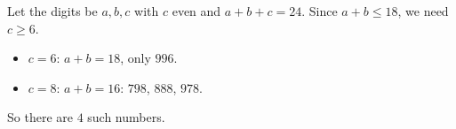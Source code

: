 Let the digits be $a,b,c$ with $c$ even and $a+b+c=24$. Since $a+b\le18$, we need $c\ge6$.
\begin{itemize}
\item $c=6$: $a+b=18$, only $996$.
\item $c=8$: $a+b=16$: $798$, $888$, $978$.
\end{itemize}
So there are $\boxed{4}$ such numbers.
